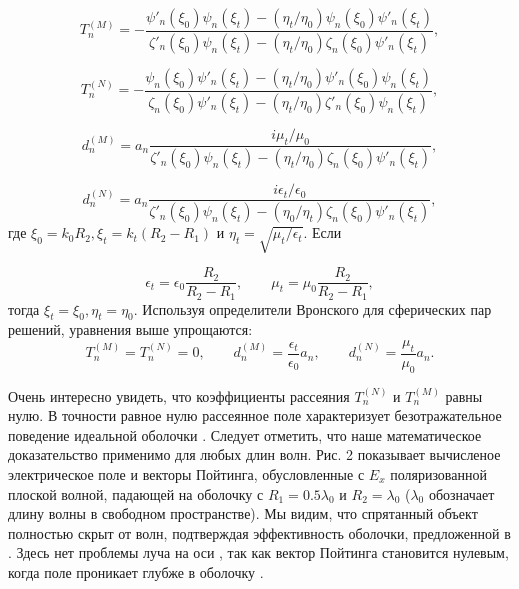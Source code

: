 \documentclass[a4paper, 12pt]{article}
\begin{document}
\begin{equation}\label{e12}
	T_n^{(M)} = - 
	\frac{\psi'_n(\xi_0)\psi_n(\xi_t)-(\eta_t/\eta_0)\psi_n(\xi_0)\psi'_n(\xi_t)}{\zeta'_n(\xi_0)\psi_n(\xi_t)-(\eta_t/\eta_0)\zeta_n(\xi_0)\psi'_n(\xi_t)},
\end{equation}

\begin{equation}\label{e13}
	T_n^{(N)} = - 
	\frac{\psi_n(\xi_0)\psi'_n(\xi_t)-(\eta_t/\eta_0)\psi'_n(\xi_0)\psi_n(\xi_t)}{\zeta_n(\xi_0)\psi'_n(\xi_t)-(\eta_t/\eta_0)\zeta'_n(\xi_0)\psi_n(\xi_t)},
\end{equation}

\begin{equation}\label{e14}
	d_n^{(M)} = a_n \frac{i\mu_t/\mu_0}{\zeta'_n(\xi_0)\psi_n(\xi_t)-(\eta_t/\eta_0)\zeta_n(\xi_0)\psi'_n(\xi_t)},
\end{equation}

\begin{equation}\label{e15}
	d_n^{(N)} = a_n \frac{i\epsilon_t/\epsilon_0}{\zeta'_n(\xi_0)\psi_n(\xi_t)-(\eta_0/\eta_t)\zeta_n(\xi_0)\psi'_n(\xi_t)},
\end{equation}
где $\xi_0=k_0R_2, \xi_t=k_t(R_2-R_1)$ и $\eta_t=\sqrt{\mu_t/\epsilon_t}$.
Если 

\begin{equation*}
	\epsilon_t=\epsilon_0 \frac{R_2}{R_2-R_1}, \qquad
	\mu_t=\mu_0 \frac{R_2}{R_2-R_1},
\end{equation*}
тогда $\xi_t=\xi_0, \eta_t=\eta_0$.
Используя определители Вронского для сферических пар решений, уравнения выше
упрощаются:
\begin{equation}\label{e16}
	T_n^{(M)}=T_n^{(N)}=0, \qquad d_n^{(M)}=\frac{\epsilon_t}{\epsilon_0}a_n,
	\qquad d_n^{(N)}=\frac{\mu_t}{\mu_0}a_n.
\end{equation}

Очень интересно увидеть, что коэффициенты рассеяния $T_n^{(N)}$ и $T_n^{(M)}$
равны нулю. В точности равное нулю рассеянное поле характеризует безотражательное
поведение идеальной оболочки \cite{4}. Следует отметить, что наше математическое
доказательство применимо для любых длин волн. Рис. 2 показывает
вычисленое электрическое поле и векторы Пойтинга, обусловленные с $E_x$ 
поляризованной плоской волной, падающей на оболочку с 
$R_1=0.5\lambda_0$ и $R_2=\lambda_0$
($\lambda_0$ обозначает длину волны в свободном пространстве). Мы видим, что
спрятанный объект полностью скрыт от волн, подтверждая эффективность оболочки,
предложенной в \cite{4}. Здесь нет проблемы луча на оси \cite{4}, так как вектор
Пойтинга становится нулевым, когда поле проникает глубже в оболочку \cite{2}.
\end{document}

